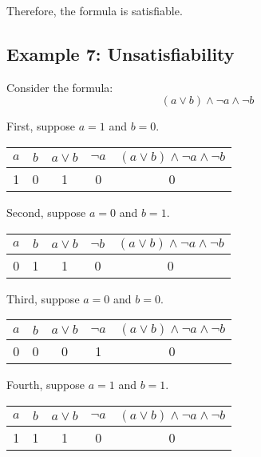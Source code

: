 \documentclass[12pt,a4paper,openany]{article}
\begin{document}
Therefore, the formula is satisfiable.

\subsection{Example 7: Unsatisfiability}

Consider the formula:
$$ (a \lor b) \land \neg a \land \neg b $$

First, suppose $a = 1$ and $b = 0$.

\begin{center}
\begin{tabular}{|c|c|c|c|c|}
\hline
$a$ & $b$ & $a \lor b$ & $\neg a$ & $(a \lor b) \land \neg a \land \neg b$ \\
\hline
\textcolor{truecolor}{1} & \textcolor{falsecolor}{0} & \textcolor{truecolor}{1} & \textcolor{falsecolor}{0} & \textcolor{falsecolor}{0} \\
\hline
\end{tabular}
\end{center}

Second, suppose $a = 0$ and $b = 1$.

\begin{center}
\begin{tabular}{|c|c|c|c|c|}
\hline
$a$ & $b$ & $a \lor b$ & $\neg b$ & $(a \lor b) \land \neg a \land \neg b$ \\
\hline
\textcolor{falsecolor}{0} & \textcolor{truecolor}{1} & \textcolor{truecolor}{1} & \textcolor{falsecolor}{0} & \textcolor{falsecolor}{0} \\
\hline
\end{tabular}
\end{center}

Third, suppose $a = 0$ and $b = 0$.

\begin{center}
\begin{tabular}{|c|c|c|c|c|}
\hline
$a$ & $b$ & $a \lor b$ & $\neg a$ & $(a \lor b) \land \neg a \land \neg b$ \\
\hline
\textcolor{falsecolor}{0} & \textcolor{falsecolor}{0} & \textcolor{falsecolor}{0} & \textcolor{truecolor}{1} & \textcolor{falsecolor}{0} \\
\hline
\end{tabular}
\end{center}

Fourth, suppose $a = 1$ and $b = 1$.

\begin{center}
\begin{tabular}{|c|c|c|c|c|}
\hline
$a$ & $b$ & $a \lor b$ & $\neg a$ & $(a \lor b) \land \neg a \land \neg b$ \\
\hline
\textcolor{truecolor}{1} & \textcolor{truecolor}{1} & \textcolor{truecolor}{1} & \textcolor{falsecolor}{0} & \textcolor{falsecolor}{0} \\
\hline
\end{tabular}
\end{center}
\end{document}
